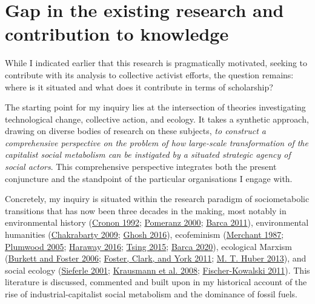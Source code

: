 \documentclass[a4paper, nobind]{templates/ociamthesis}
\begin{document}
\hypertarget{gap-in-the-existing-research-and-contribution-to-knowledge}{%
\section{Gap in the existing research and contribution to knowledge}\label{gap-in-the-existing-research-and-contribution-to-knowledge}}

While I indicated earlier that this research is pragmatically motivated, seeking to contribute with its analysis to collective activist efforts, the question remains: where is it situated and what does it contribute in terms of scholarship?

The starting point for my inquiry lies at the intersection of theories investigating technological change, collective action, and ecology. It takes a synthetic approach, drawing on diverse bodies of research on these subjects, \emph{to construct a comprehensive perspective on the problem of how large-scale transformation of the capitalist social metabolism can be instigated by a situated strategic agency of social actors}. This comprehensive perspective integrates both the present conjuncture and the standpoint of the particular organisations I engage with.

Concretely, my inquiry is situated within the research paradigm of sociometabolic transitions that has now been three decades in the making, most notably in environmental history (\protect\hyperlink{ref-cronon_natures_1992}{Cronon 1992}; \protect\hyperlink{ref-pomeranz_great_2000}{Pomeranz 2000}; \protect\hyperlink{ref-barca_energy_2011}{Barca 2011}), environmental humanities (\protect\hyperlink{ref-chakrabarty_climate_2009}{Chakrabarty 2009}; \protect\hyperlink{ref-ghosh_great_2016}{Ghosh 2016}), ecofeminism (\protect\hyperlink{ref-merchant_theoretical_1987}{Merchant 1987}; \protect\hyperlink{ref-plumwood_environmental_2005}{Plumwood 2005}; \protect\hyperlink{ref-haraway_staying_2016}{Haraway 2016}; \protect\hyperlink{ref-tsing_mushroom_2015}{Tsing 2015}; \protect\hyperlink{ref-barca_forces_2020}{Barca 2020}), ecological Marxism (\protect\hyperlink{ref-burkett_metabolism_2006}{Burkett and Foster 2006}; \protect\hyperlink{ref-foster_ecological_2011}{Foster, Clark, and York 2011}; \protect\hyperlink{ref-huber_lifeblood_2013}{M. T. Huber 2013}), and social ecology (\protect\hyperlink{ref-sieferle_subterranean_2001}{Sieferle 2001}; \protect\hyperlink{ref-krausmann_global_2008}{Krausmann et al. 2008}; \protect\hyperlink{ref-fischer-kowalski_analyzing_2011}{Fischer-Kowalski 2011}). This literature is discussed, commented and built upon in my historical account of the rise of industrial-capitalist social metabolism and the dominance of fossil fuels.
\end{document}
